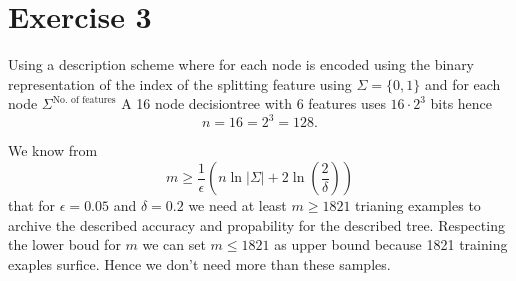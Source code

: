 \section*{Exercise 3}
Using a description scheme where for each node is encoded using the binary representation of the index of the splitting feature using $\Sigma = \lbrace0,1\rbrace$ and for each node $\Sigma^{\text{No. of features}}$
A 16 node decisiontree with 6 features uses $16\cdot 2^3$ bits hence \[n=16=2^3=128.\]

We know from \[m \ge \frac{1}{\epsilon}\left(n \ln |\Sigma| + 2\ln\left(\frac{2}{\delta}\right)\right)\] that for $\epsilon = 0.05$ and $\delta = 0.2$ we need at least $m\ge1821$ trianing examples to archive the described accuracy and propability for the described tree.
Respecting the lower boud for $m$ we can set $m\le 1821$ as upper bound because 1821 training exaples surfice. Hence we don't need more than these samples.